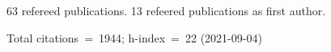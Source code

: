 63 refereed publications. 13 refeered publications as first author.

Total citations~=~1944; h-index~=~22 (2021-09-04)